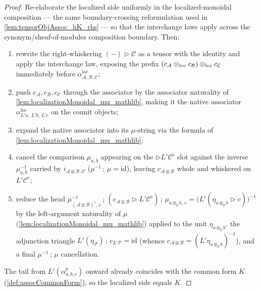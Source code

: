\begin{proof}
  Re-elaborate the localized side uniformly in the localized-monoidal composition --- the same
  boundary-crossing reformulation used in \cref{lem:tensorObjAssoc_hK_rhs} --- so that the interchange
  laws apply across the synonym/sheaf-of-modules composition boundary. Then:
  \begin{enumerate}
    \item rewrite the right-whiskering \((-)\rhd\mathcal{C}\) as a tensor with the identity and apply the
      interchange law, exposing the prefix
      \((c_{\mathcal{A}}\mathbin{\otimes_{\mathrm{loc}}} c_{\mathcal{B}})\mathbin{\otimes_{\mathrm{loc}}} c_{\mathcal{C}}\) immediately before
      \(\alpha^{\mathrm{loc}}_{\mathcal{A},\mathcal{B},\mathcal{C}}\);
    \item push \(c_{\mathcal{A}}, c_{\mathcal{B}}, c_{\mathcal{C}}\) through the associator by
      the associator naturality of \cref{lem:localizationMonoidal_mu_mathlib}, making it the native
      associator \(\alpha^{\mathrm{loc}}_{L'a,\,L'b,\,L'c}\) on the counit objects;
    \item expand the native associator into its \(\mu\)-string via the formula of
      \cref{lem:localizationMonoidal_mu_mathlib};
    \item cancel the comparison \(\mu_{a,b}\) appearing on the \(\rhd L'\mathcal{C}^{\flat}\) slot against
      the inverse \(\mu_{a,b}^{-1}\) carried by \(i_{\mathcal{A}\otimes\mathcal{B},\mathcal{C}}\)
      (\(\mu^{-1}\,;\,\mu = \mathrm{id}\)), leaving \(c_{\mathcal{A}\otimes\mathcal{B}}\) whole and
      whiskered on \(L'\mathcal{C}^{\flat}\);
    \item reduce the head
      \(\mu_{(\mathcal{A}\otimes\mathcal{B})^{\flat},\,c}^{-1}\,;\,
        (c_{\mathcal{A}\otimes\mathcal{B}} \rhd L'\mathcal{C}^{\flat})\,;\,\mu_{a\otimes_p b,\,c}
        = \bigl(L'(\eta_{a\otimes_p b} \rhd c)\bigr)^{-1}\) by the left-argument naturality of \(\mu\)
      (\cref{lem:localizationMonoidal_mu_mathlib}) applied to the unit \(\eta_{a\otimes_p b}\), the
      adjunction triangle \(L'(\eta_{\mathcal{P}})\,;\,c_{L'\mathcal{P}} = \mathrm{id}\) (whence
      \(c_{\mathcal{A}\otimes\mathcal{B}} = (L'\eta_{a\otimes_p b})^{-1}\)), and a final
      \(\mu^{-1}\,;\,\mu\) cancellation.
  \end{enumerate}
  The tail from \(L'(\alpha^p_{a,b,c})\) onward already coincides with the common form \(K\)
  (\cref{def:assocCommonForm}), so the localized side equals \(K\).
\end{proof}

